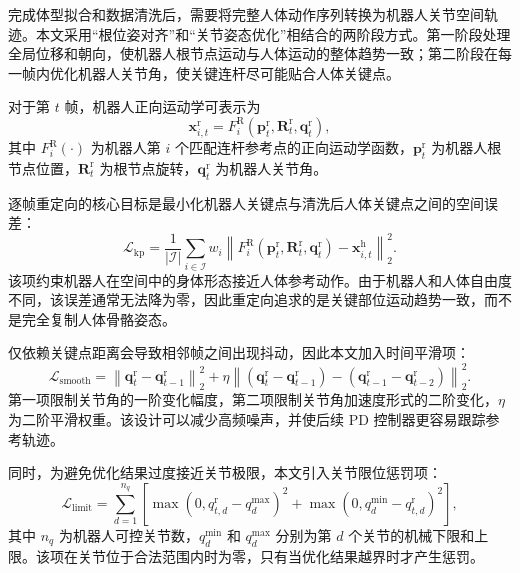 完成体型拟合和数据清洗后，需要将完整人体动作序列转换为机器人关节空间轨迹。本文采用“根位姿对齐”和“关节姿态优化”相结合的两阶段方式\cite{he2024learning}。第一阶段处理全局位移和朝向，使机器人根节点运动与人体运动的整体趋势一致；第二阶段在每一帧内优化机器人关节角，使关键连杆尽可能贴合人体关键点。

对于第 $t$ 帧，机器人正向运动学可表示为
\begin{equation}
\boldsymbol{x}^{\mathrm{r}}_{i,t}
=
F^{\mathrm{R}}_i
\left(
\boldsymbol{p}^{\mathrm{r}}_t,
\boldsymbol{R}^{\mathrm{r}}_t,
\boldsymbol{q}^{\mathrm{r}}_t
\right),
\end{equation}
其中 $F^{\mathrm{R}}_i(\cdot)$ 为机器人第 $i$ 个匹配连杆参考点的正向运动学函数，$\boldsymbol{p}^{\mathrm{r}}_t$ 为机器人根节点位置，$\boldsymbol{R}^{\mathrm{r}}_t$ 为根节点旋转，$\boldsymbol{q}^{\mathrm{r}}_t$ 为机器人关节角。

逐帧重定向的核心目标是最小化机器人关键点与清洗后人体关键点之间的空间误差：
\begin{equation}
\mathcal{L}_{\mathrm{kp}}
=
\frac{1}{|\mathcal{I}|}
\sum_{i\in\mathcal{I}}
w_i
\left\|
F^{\mathrm{R}}_i
\left(
\boldsymbol{p}^{\mathrm{r}}_t,
\boldsymbol{R}^{\mathrm{r}}_t,
\boldsymbol{q}^{\mathrm{r}}_t
\right)
-
\boldsymbol{x}^{\mathrm{h}}_{i,t}
\right\|_2^2 .
\end{equation}
该项约束机器人在空间中的身体形态接近人体参考动作。由于机器人和人体自由度不同，该误差通常无法降为零，因此重定向追求的是关键部位运动趋势一致，而不是完全复制人体骨骼姿态。

仅依赖关键点距离会导致相邻帧之间出现抖动，因此本文加入时间平滑项：
\begin{equation}
\mathcal{L}_{\mathrm{smooth}}
=
\left\|
\boldsymbol{q}^{\mathrm{r}}_t
-
\boldsymbol{q}^{\mathrm{r}}_{t-1}
\right\|_2^2
+
\eta
\left\|
\left(\boldsymbol{q}^{\mathrm{r}}_t-\boldsymbol{q}^{\mathrm{r}}_{t-1}\right)
-
\left(\boldsymbol{q}^{\mathrm{r}}_{t-1}-\boldsymbol{q}^{\mathrm{r}}_{t-2}\right)
\right\|_2^2 .
\end{equation}
第一项限制关节角的一阶变化幅度，第二项限制关节角加速度形式的二阶变化，$\eta$ 为二阶平滑权重。该设计可以减少高频噪声，并使后续 PD 控制器更容易跟踪参考轨迹。

同时，为避免优化结果过度接近关节极限，本文引入关节限位惩罚项：
\begin{equation}
\mathcal{L}_{\mathrm{limit}}
=
\sum_{d=1}^{n_q}
\left[
\max\left(0,q^{\mathrm{r}}_{t,d}-q_{d}^{\max}\right)^2
+
\max\left(0,q_{d}^{\min}-q^{\mathrm{r}}_{t,d}\right)^2
\right],
\end{equation}
其中 $n_q$ 为机器人可控关节数，$q_{d}^{\min}$ 和 $q_{d}^{\max}$ 分别为第 $d$ 个关节的机械下限和上限。该项在关节位于合法范围内时为零，只有当优化结果越界时才产生惩罚。

